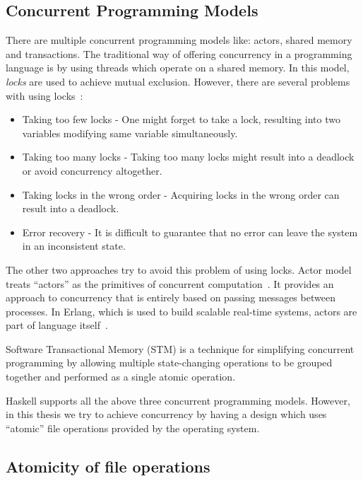 \subsection{Concurrent Programming Models}

There are multiple concurrent programming models like: actors, shared memory and transactions. The traditional way of offering concurrency in a programming language is by using threads which operate on a shared memory. In this model, \textit{locks} are used to achieve mutual exclusion. However, there are several problems with using locks~\cite{jones2007beautiful}:

\begin{itemize}
  \item Taking too few locks - One might forget to take a lock, resulting into two variables modifying same variable simultaneously.
  \item Taking too many locks - Taking too many locks might result into a deadlock or avoid concurrency altogether.
  \item Taking locks in the wrong order - Acquiring locks in the wrong order can result into a deadlock.
  \item Error recovery - It is difficult to guarantee that no error can leave the system in an inconsistent state.
\end{itemize}

The other two approaches try to avoid this problem of using locks. Actor model treats ``actors'' as the primitives of concurrent computation~\cite{hewitt1973universal}. It provides an approach to concurrency that is entirely based on passing messages between processes. In Erlang, which is used to build scalable real-time systems, actors are part of language itself~\cite{armstrong1993concurrent}.

Software Transactional Memory (STM) is a technique for simplifying concurrent programming by allowing multiple state-changing operations to be grouped together and performed as a single atomic operation.

Haskell supports all the above three concurrent programming models. However, in this thesis we try to achieve concurrency by having a design which uses ``atomic'' file operations provided by the operating system.

\subsection{Atomicity of file operations}

